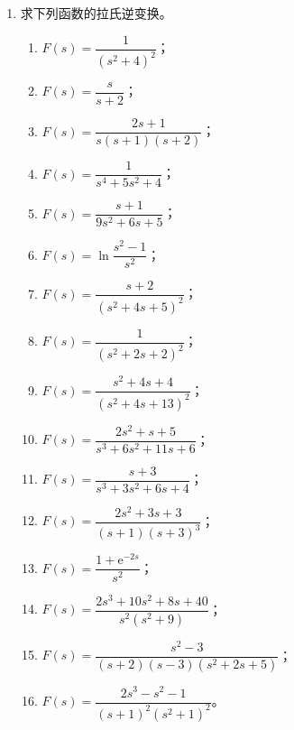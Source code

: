 \documentclass[UTF8,11pt,a4paper]{ctexart}
\newcommand{\ee}{\mathrm{e}}
\begin{document}
\begin{enumerate}
\item 求下列函数的拉氏逆变换。
  \begin{enumerate}
  \item $F(s)=\dfrac1{(s^2+4)^2}$；
  \item $F(s)=\dfrac s{s+2}$；
  \item $F(s)=\dfrac{2s+1}{s(s+1)(s+2)}$；
  \item $F(s)=\dfrac1{s^4+5s^2+4}$；
  \item $F(s)=\dfrac{s+1}{9s^2+6s+5}$；
  \item $F(s)=\ln\dfrac{s^2-1}{s^2}$；
  \item $F(s)=\dfrac{s+2}{(s^2+4s+5)^2}$；
  \item $F(s)=\dfrac1{(s^2+2s+2)^2}$；
  \item $F(s)=\dfrac{s^2+4s+4}{(s^2+4s+13)^2}$；
  \item $F(s)=\dfrac{2s^2+s+5}{s^3+6s^2+11s+6}$；
  \item $F(s)=\dfrac{s+3}{s^3+3s^2+6s+4}$；
  \item $F(s)=\dfrac{2s^2+3s+3}{(s+1)(s+3)^3}$；
  \item $F(s)=\dfrac{1+\ee^{-2s}}{s^2}$；
  \item $F(s)=\dfrac{2s^3+10s^2+8s+40}{s^2(s^2+9)}$；
  \item $F(s)=\dfrac{s^2-3}{(s+2)(s-3)(s^2+2s+5)}$；
  \item $F(s)=\dfrac{2s^3-s^2-1}{(s+1)^2(s^2+1)^2}$。
  \end{enumerate}


\end{enumerate}
\end{document}
